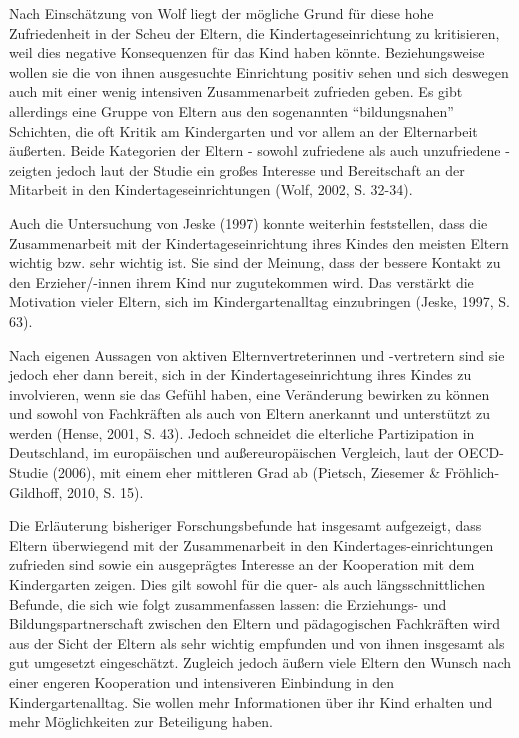 \documentclass[12pt,a4paper]{article}
\begin{document}
	Nach Einschätzung von Wolf liegt der mögliche Grund für diese hohe Zufriedenheit in der Scheu der Eltern, die Kindertageseinrichtung zu kritisieren, weil dies negative Konsequenzen für das Kind haben könnte. Beziehungsweise wollen sie die von ihnen ausgesuchte Einrichtung positiv sehen und sich deswegen auch mit einer wenig intensiven Zusammenarbeit zufrieden geben. Es gibt allerdings eine Gruppe von Eltern aus den sogenannten "`bildungsnahen"' Schichten, die oft Kritik am Kindergarten und vor allem an der Elternarbeit äußerten. Beide Kategorien der Eltern - sowohl zufriedene als auch unzufriedene - zeigten jedoch laut der Studie ein großes Interesse und Bereitschaft an der Mitarbeit in den Kindertageseinrichtungen (Wolf, 2002, S. 32-34).
	
Auch die Untersuchung von Jeske (1997) konnte weiterhin feststellen, dass die Zusammenarbeit mit der Kindertageseinrichtung ihres Kindes den meisten Eltern wichtig bzw. sehr wichtig ist. Sie sind der Meinung, dass der bessere Kontakt zu den Erzieher/-innen ihrem Kind nur zugutekommen wird. Das verstärkt die Motivation vieler Eltern, sich im Kindergartenalltag einzubringen  (Jeske, 1997, S. 63).

Nach eigenen Aussagen von aktiven Elternvertreterinnen und -vertretern sind sie jedoch eher dann bereit, sich in der Kindertageseinrichtung ihres Kindes zu involvieren, wenn sie das Gefühl haben, eine Veränderung bewirken zu können und sowohl von Fachkräften als auch von Eltern anerkannt und unterstützt zu werden (Hense, 2001, S. 43). Jedoch schneidet die elterliche Partizipation in Deutschland, im europäischen und außereuropäischen Vergleich, laut der OECD-Studie (2006), mit einem eher mittleren Grad ab (Pietsch, Ziesemer \& Fröhlich-Gildhoff, 2010, S. 15).

	 Die Erläuterung bisheriger Forschungsbefunde hat insgesamt aufgezeigt, dass Eltern überwiegend mit der Zusammenarbeit in den Kindertages-einrichtungen zufrieden sind sowie ein ausgeprägtes Interesse an der Kooperation mit dem Kindergarten zeigen. Dies gilt sowohl für die quer- als auch längsschnittlichen Befunde, die sich wie folgt zusammenfassen lassen: die Erziehungs- und Bildungspartnerschaft zwischen den Eltern und pädagogischen Fachkräften wird aus der Sicht der Eltern als sehr wichtig empfunden und von ihnen insgesamt als gut umgesetzt eingeschätzt. Zugleich jedoch äußern viele Eltern den Wunsch nach einer engeren Kooperation und intensiveren Einbindung in den Kindergartenalltag. Sie wollen mehr Informationen über ihr Kind erhalten und mehr Möglichkeiten zur Beteiligung haben.	
	 
\end{document}
